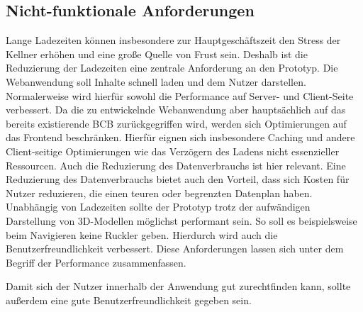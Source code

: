 \subsection{Nicht-funktionale Anforderungen}
Lange Ladezeiten können insbesondere zur Hauptgeschäftszeit den Stress der Kellner erhöhen und eine große Quelle von Frust sein. Deshalb ist die Reduzierung der Ladezeiten eine zentrale Anforderung an den Prototyp. Die Webanwendung soll Inhalte schnell laden und dem Nutzer darstellen. Normalerweise wird hierfür sowohl die Performance auf Server- und Client-Seite verbessert. Da die zu entwickelnde Webanwendung aber hauptsächlich auf das bereits existierende \ac{BCB} zurückgegriffen wird, werden sich Optimierungen auf das Frontend beschränken. Hierfür eignen sich insbesondere Caching und andere Client-seitige Optimierungen wie das Verzögern des Ladens nicht essenzieller Ressourcen. Auch die Reduzierung des Datenverbrauchs ist hier relevant. Eine Reduzierung des Datenverbrauchs bietet auch den Vorteil, dass sich Kosten für Nutzer reduzieren, die einen teuren oder begrenzten Datenplan haben. Unabhängig von Ladezeiten sollte der Prototyp trotz der aufwändigen Darstellung von 3D-Modellen möglichst performant sein. So soll es beispielsweise beim Navigieren keine Ruckler geben. Hierdurch wird auch die Benutzerfreundlichkeit verbessert. Diese Anforderungen lassen sich unter dem Begriff der Performance zusammenfassen.

Damit sich der Nutzer innerhalb der Anwendung gut zurechtfinden kann, sollte außerdem eine gute Benutzerfreundlichkeit gegeben sein.
